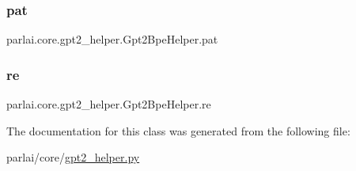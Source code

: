 \subsubsection{\texorpdfstring{pat}{pat}}
{\footnotesize\ttfamily parlai.\+core.\+gpt2\+\_\+helper.\+Gpt2\+Bpe\+Helper.\+pat}

\mbox{\label{classparlai_1_1core_1_1gpt2__helper_1_1Gpt2BpeHelper_ac1ad446c51c26831655244d83350589a}} 
\subsubsection{\texorpdfstring{re}{re}}
{\footnotesize\ttfamily parlai.\+core.\+gpt2\+\_\+helper.\+Gpt2\+Bpe\+Helper.\+re}



The documentation for this class was generated from the following file\+:\begin{DoxyCompactItemize}
\item 
parlai/core/\hyperlink{gpt2__helper_8py}{gpt2\+\_\+helper.\+py}\end{DoxyCompactItemize}
